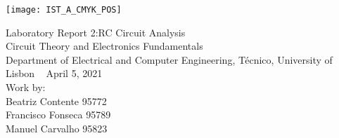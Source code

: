 
\thispagestyle {empty}

\texttt{[image: IST\_A\_CMYK\_POS]}

\begin{center}
%
\vspace{1.0cm}

\vspace{1cm}
{\FontLb Laboratory Report 2:RC Circuit Analysis} \\ %
\vspace{1cm}
{\FontSn Circuit Theory and Electronics Fundamentals} \\
\vspace{1cm}
{\FontSn Department of Electrical and Computer Engineering, Técnico, University of Lisbon} \ %
\vspace{1cm}
{\FontSn April 5, 2021} \\ %
\vspace{1cm}
{\FontSn Work by:} \\ 
\vspace{0.5cm}
{\FontSn Beatriz Contente 95772} \\ 
\vspace{0.5cm}
{\FontSn Francisco Fonseca 95789} \\ 
\vspace{0.5cm}
{\FontSn Manuel Carvalho 95823} \\ 
%
\end{center}
